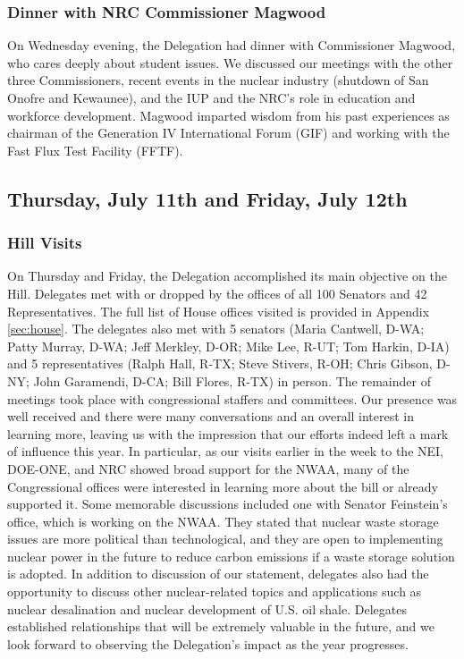 \subsubsection*{Dinner with NRC Commissioner Magwood}

On Wednesday evening, the Delegation had dinner with Commissioner Magwood, who
cares deeply about student issues. We discussed our meetings with the other
three Commissioners, recent events in the nuclear industry (shutdown of San
Onofre and Kewaunee), and the IUP and the NRC’s role in education and workforce
development. Magwood imparted wisdom from his past experiences as chairman of
the Generation IV International Forum (GIF) and working with the Fast Flux Test
Facility (FFTF).

\subsection*{Thursday, July 11th and Friday, July 12th}

\subsubsection*{Hill Visits}

On Thursday and Friday, the Delegation accomplished its main objective on the
Hill. Delegates met with or dropped by the offices of all 100 Senators and 42
Representatives. The full list of House offices visited is provided in Appendix
\ref{sec:house}. The delegates also met with 5 senators (Maria Cantwell, D-WA;
Patty Murray, D-WA; Jeff Merkley, D-OR; Mike Lee, R-UT; Tom Harkin, D-IA) and 5
representatives (Ralph Hall, R-TX; Steve Stivers, R-OH; Chris Gibson, D-NY; John
Garamendi, D-CA; Bill Flores, R-TX) in person. The remainder of meetings took
place with congressional staffers and committees. Our presence was well received
and there were many conversations and an overall interest in learning more,
leaving us with the impression that our efforts indeed left a mark of influence
this year. In particular, as our visits earlier in the week to the NEI, DOE-ONE,
and NRC showed broad support for the NWAA, many of the Congressional offices
were interested in learning more about the bill or already supported it. Some
memorable discussions included one with Senator Feinstein’s office, which is
working on the NWAA. They stated that nuclear waste storage issues are more
political than technological, and they are open to implementing nuclear power in
the future to reduce carbon emissions if a waste storage solution is adopted. In
addition to discussion of our statement, delegates also had the opportunity to
discuss other nuclear-related topics and applications such as nuclear
desalination and nuclear development of U.S. oil shale. Delegates established
relationships that will be extremely valuable in the future, and we look forward
to observing the Delegation’s impact as the year progresses.

